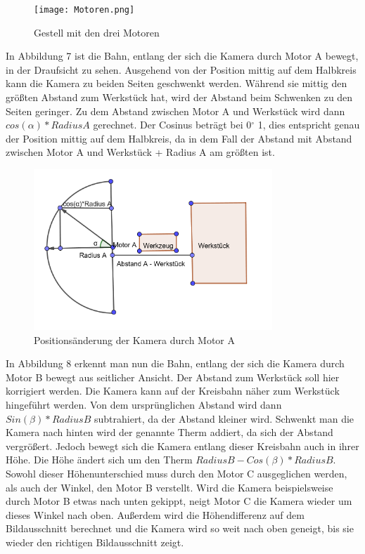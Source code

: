 \documentclass[12pt,a4paper,bibliography=totocnumbered,listof=totocnumbered]{scrartcl}
\begin{document}
\begin{figure}[htbp]
\centering 
\texttt{[image: Motoren.png]}
\caption{Gestell mit den drei Motoren}
\label{fig:Bild6}
\end{figure}
\break
In Abbildung 7 ist die Bahn, entlang der sich die Kamera durch Motor A bewegt, in der Draufsicht zu sehen. Ausgehend von der Position mittig auf dem Halbkreis kann die Kamera zu beiden Seiten geschwenkt werden. Während sie mittig den größten Abstand zum Werkstück hat, wird der Abstand beim Schwenken zu den Seiten geringer. Zu dem Abstand zwischen Motor A und Werkstück wird dann $cos(\alpha) * Radius A$ gerechnet. Der Cosinus beträgt bei 0$^\circ$ 1, dies entspricht genau der Position mittig auf dem Halbkreis, da in dem Fall der Abstand mit Abstand zwischen Motor A und Werkstück + Radius A am größten ist. 
\begin{figure}[htbp]
\centering 
\includegraphics[width=0.8\textwidth]{Motor_A.PNG}
\caption{Positionsänderung der Kamera durch Motor A}
\label{fig:Bild7}
\end{figure}
\break
In Abbildung 8 erkennt man nun die Bahn, entlang der sich die Kamera durch Motor B bewegt aus seitlicher Ansicht. Der Abstand zum Werkstück soll hier korrigiert werden. Die Kamera kann auf der Kreisbahn näher zum Werkstück hingeführt werden. Von dem ursprünglichen Abstand wird dann $Sin(\beta)*Radius B$ subtrahiert, da der Abstand kleiner wird. Schwenkt man die Kamera nach hinten wird der genannte Therm addiert, da sich der Abstand vergrößert. Jedoch bewegt sich die Kamera entlang dieser Kreisbahn auch in ihrer Höhe. Die Höhe ändert sich um den Therm $Radius B - Cos(\beta) *Radius B$. Sowohl dieser Höhenunterschied muss durch den Motor C ausgeglichen werden, als auch der Winkel, den Motor B verstellt. Wird die Kamera beispielsweise durch Motor B etwas nach unten gekippt, neigt Motor C die Kamera wieder um dieses Winkel nach oben. Außerdem wird die Höhendifferenz auf dem Bildausschnitt berechnet und die Kamera wird so weit nach oben geneigt, bis sie wieder den richtigen Bildausschnitt zeigt.
\end{document}
